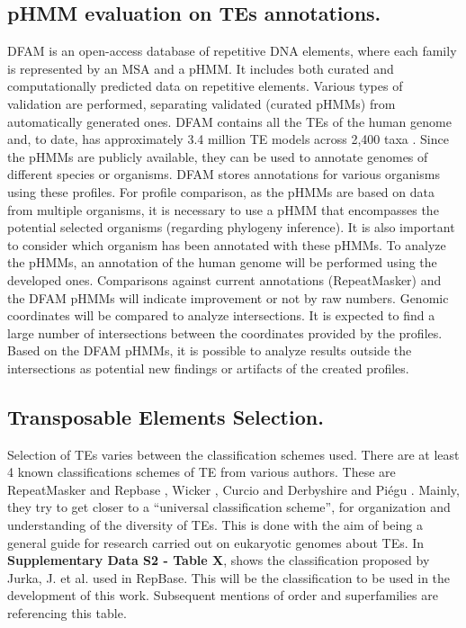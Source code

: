 \documentclass[unnumsec,webpdf,contemporary,large]{oup-authoring-template}%
\theoremstyle{thmstyleone}%
\theoremstyle{thmstyletwo}%
\theoremstyle{thmstylethree}%
\begin{document}
\subsection{pHMM evaluation on TEs annotations.}\label{subsec2_4}

DFAM is an open-access database of repetitive DNA elements, where each family is represented by an MSA and a pHMM. It includes both curated and computationally predicted data on repetitive elements. Various types of validation are performed, separating validated (curated pHMMs) from automatically generated ones. DFAM contains all the TEs of the human genome and, to date, has approximately 3.4 million TE models across 2,400 taxa \cite{storer_curation_2021, dfam_team_dfam_2023}. Since the pHMMs are publicly available, they can be used to annotate genomes of different species or organisms. DFAM stores annotations for various organisms using these profiles. For profile comparison, as the pHMMs are based on data from multiple organisms, it is necessary to use a pHMM that encompasses the potential selected organisms (regarding phylogeny inference). It is also important to consider which organism has been annotated with these pHMMs. To analyze the pHMMs, an annotation of the human genome will be performed using the developed ones. Comparisons against current annotations (RepeatMasker) and the DFAM pHMMs will indicate improvement or not by raw numbers. Genomic coordinates will be compared to analyze intersections. It is expected to find a large number of intersections between the coordinates provided by the profiles. Based on the DFAM pHMMs, it is possible to analyze results outside the intersections as potential new findings or artifacts of the created profiles.

\subsection{Transposable Elements Selection.}\label{subsec2_5}

Selection of TEs varies between the classification schemes used. There are at least 4 known classifications schemes of TE from various authors. These are RepeatMasker and Repbase \cite{kapitonov_universal_2008}, Wicker \cite{wicker_unified_2007}, Curcio and Derbyshire \cite{curcio_outs_2003} and Piégu \cite{piegu_survey_2015}. Mainly, they try to get closer to a “universal classification scheme”, for organization and understanding of the diversity of TEs. This is done with the aim of being a general guide for research carried out on eukaryotic genomes about TEs. In \textbf{Supplementary Data S2 - Table X}, shows the classification proposed by Jurka, J. et al. used in RepBase. This will be the classification to be used in the development of this work. Subsequent mentions of order and superfamilies are referencing this table.
\end{document}
